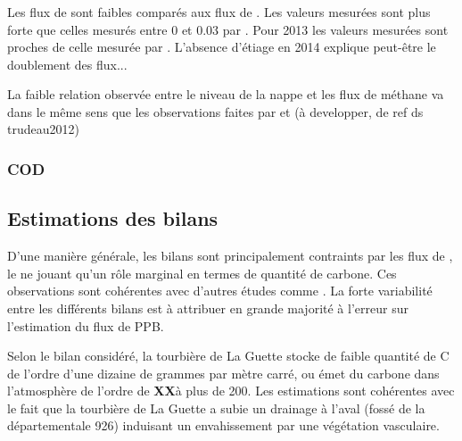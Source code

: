 
\subsubsection{\chh}
Les flux de \chh sont faibles comparés aux flux de \coo.
Les valeurs mesurées sont plus forte que celles mesurés entre \num{0} et \SI{0.03}{\uml} par \citet{bortoluzzi2006}.
Pour 2013 les valeurs mesurées sont proches de celle mesurée par \citet{long2010}.
L'absence d'étiage en 2014 explique peut-être le doublement des flux... \plop

La faible relation observée entre le niveau de la nappe et les flux de méthane va dans le même sens que les observations faites par \citet{trudeau2012} et (à developper, de ref ds trudeau2012)



\subsubsection{COD}

\subsection{Estimations des bilans}

D'une manière générale, les bilans sont principalement contraints par les flux de \coo, le \chh ne jouant qu'un rôle marginal en termes de quantité de carbone.
Ces observations sont cohérentes avec d'autres études comme \citet{bortoluzzi2006,worrall2009}.
La forte variabilité entre les différents bilans est à attribuer en grande majorité à l'erreur sur l'estimation du flux de PPB.

Selon le bilan considéré, la tourbière de La Guette stocke de faible quantité de C de l'ordre d'une dizaine de grammes par mètre carré, ou émet du carbone dans l'atmosphère de l'ordre de \textbf{XX}à plus de \SI{200}{\gcma}.
Les estimations sont cohérentes avec le fait que la tourbière de La Guette a subie un drainage à l'aval (fossé de la départementale 926) induisant un envahissement par une végétation vasculaire.




